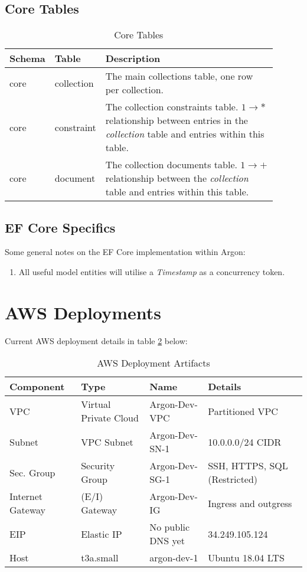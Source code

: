 \documentclass{book}
\begin{document}
\subsection{Core Tables}
\begin{table}[h!]
    \centering
    \begin{tabular}{|| p{0.1\linewidth} | p{0.1\linewidth} | p{0.7\linewidth} ||}
        \hline
        \textbf{Schema} & \textbf{Table} & \textbf{Description}\\
        \hline
        core & collection & The main collections table, one row per collection.\\
        \hline
        core & constraint & The collection constraints table. $1 \rightarrow *$ relationship between entries in the \textit{collection} table and entries within this table. \\
        \hline
        core & document & The collection documents table.  $1 \rightarrow +$ relationship between the \textit{collection} table and entries within this table.\\
        \hline
    \end{tabular}
    \caption{Core Tables}
    \label{table_core_tables}
\end{table}

\subsection{EF Core Specifics}
Some general notes on the EF Core implementation within Argon:
\begin{enumerate}
    \item All useful model entities will utilise a \textit{Timestamp} as a concurrency token. 
\end{enumerate}

\section{AWS Deployments}
Current AWS deployment details in table \ref{table:2} below:
\begin{table}[h!]
    \centering
    \begin{tabular}{|| l | l | l | l ||}
        \hline 
        \textbf{Component} & \textbf{Type} & \textbf{Name} & \textbf{Details} \\
        \hline
        VPC & Virtual Private Cloud & Argon-Dev-VPC & Partitioned VPC \\
        Subnet & VPC Subnet & Argon-Dev-SN-1 & 10.0.0.0/24 CIDR \\
        Sec. Group & Security Group & Argon-Dev-SG-1 & SSH, HTTPS, SQL (Restricted) \\
        Internet Gateway & (E/I) Gateway & Argon-Dev-IG & Ingress and outgress \\
        EIP & Elastic IP & No public DNS yet & 34.249.105.124 \\
        Host & t3a.small & argon-dev-1 & Ubuntu 18.04 LTS \\
        \hline
    \end{tabular}
    \caption{AWS Deployment Artifacts}
    \label{table:2}
\end{table}   
\end{document}
